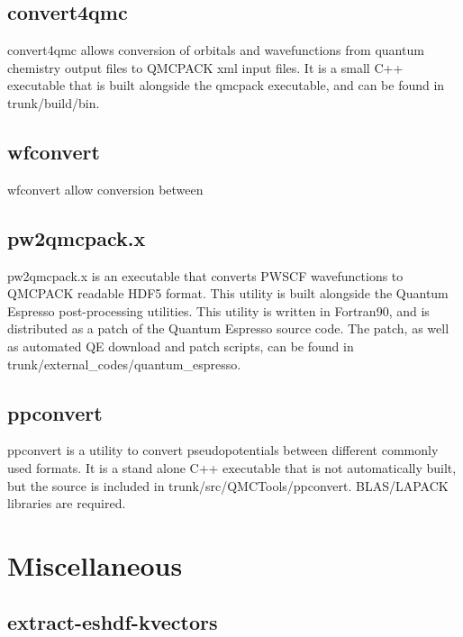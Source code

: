   \subsection{convert4qmc}
    convert4qmc allows conversion of orbitals and wavefunctions from quantum chemistry
    output files to QMCPACK xml input files.  It is a small C++ executable that is built 
    alongside the qmcpack executable, and can be found in trunk/build/bin.  
  \subsection{wfconvert}
    wfconvert allow conversion between 
  \subsection{pw2qmcpack.x}
    pw2qmcpack.x is an executable that converts PWSCF wavefunctions to QMCPACK readable 
    HDF5 format.  This utility is built alongside the Quantum Espresso post-processing utilities.
    This utility is written in Fortran90, and is distributed as a patch of the Quantum Espresso 
    source code.  The patch, as well as automated QE download and patch scripts, can be found in 
    trunk/external_codes/quantum_espresso.
  \subsection{ppconvert}
    ppconvert is a utility to convert pseudopotentials between different commonly used formats.
    It is a stand alone C++ executable that is not automatically built, but the source is 
    included in trunk/src/QMCTools/ppconvert.  BLAS/LAPACK libraries are required.  

\section{Miscellaneous}
  \subsection{extract-eshdf-kvectors}
    

